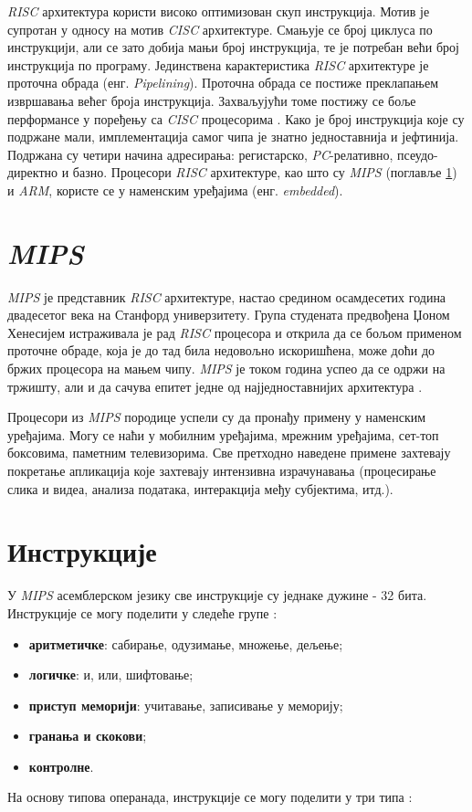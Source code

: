 \documentclass[12pt,oneside]{memoir}
\begin{document}
\textit{RISC} архитектура користи високо оптимизован скуп инструкција. Мотив је супротан у односу на мотив
\textit{CISC} архитектуре. Смањује се број циклуса по инструкцији, али се зато добија мањи број инструкција, те је
потребан већи број инструкција по програму. Јединствена карактеристика \textit{RISC} архитектуре је проточна обрада
(енг. \textit{Pipelining}). Проточна обрада се постиже преклапањем извршавања већег броја инструкција. Захваљујући
томе постижу се боље перформансе у поређењу са \textit{CISC} процесорима \cite{CR}. Како је број инструкција које су
подржане мали, имплементација самог чипа је знатно једноставнија и јефтинија. Подржана су четири начина адресирања:
регистарско, \textit{PC}-релативно, псеудо-директно и базно. Процесори \textit{RISC} архитектуре, као што су \textit{MIPS} (поглавље \ref{chp:MIPS})
и \textit{ARM}, користе се у наменским уређајима (енг. \textit{embedded}).

\section{\textit{MIPS}} \label{chp:MIPS}

\textit{MIPS} је представник \textit{RISC} архитектуре, настао средином осамдесетих година двадесетог века на
Станфорд универзитету. Група студената предвођена Џоном Хенесијем истраживала је рад \textit{RISC} процесора и
открила да се бољом применом проточне обраде, која је до тад била недовољно искоришћена, може доћи до бржих
процесора на мањем чипу. \textit{MIPS} је током година успео да се одржи на тржишту, али и да сачува епитет једне од
најједноставнијих архитектура \cite{SMR}.

Процесори из \textit{MIPS} породице успели су да пронађу примену у наменским уређајима. Могу се наћи у мобилним
уређајима, мрежним уређајима, сет-топ боксовима, паметним телевизорима. Све претходно наведене примене захтевају
покретање апликација које захтевају интензивна израчунавања (процесирање слика и видеа, анализа података,
интеракција међу субјектима, итд.).

\section{Инструкције} \label{chp:INS}

У \textit{MIPS} асемблерском језику све инструкције су једнаке дужине - 32 бита. Инструкције се могу поделити у следеће групе
\cite{ISA}:

\begin{itemize}
	\item \textbf{аритметичке}: сабирање, одузимање, множење, дељење;
	\item \textbf{логичке}: и, или, шифтовање;
	\item \textbf{приступ меморији}: учитавање, записивање у меморију;
	\item \textbf{гранања и скокови};
	\item \textbf{контролне}.
\end{itemize}
На основу типова операнада, инструкције се могу поделити у три типа \cite{SMR}:
\end{document}
